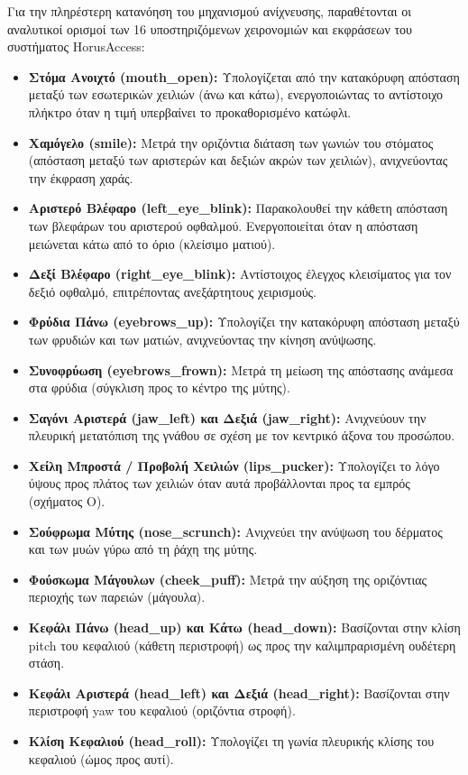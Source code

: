 \documentclass[twoside, a4paper, 11pt]{article}
\newcommand{\textlatin}[1]{\textenglish{#1}}
\begin{document}
Για την πληρέστερη κατανόηση του μηχανισμού ανίχνευσης, παραθέτονται οι αναλυτικοί ορισμοί των 16 υποστηριζόμενων χειρονομιών και εκφράσεων του συστήματος \textlatin{HorusAccess}:

\begin{itemize}
    \item \textbf{Στόμα Ανοιχτό (\textlatin{mouth\_open}):} Υπολογίζεται από την κατακόρυφη απόσταση μεταξύ των εσωτερικών χειλιών (άνω και κάτω), ενεργοποιώντας το αντίστοιχο πλήκτρο όταν η τιμή υπερβαίνει το προκαθορισμένο κατώφλι.
    \item \textbf{Χαμόγελο (\textlatin{smile}):} Μετρά την οριζόντια διάταση των γωνιών του στόματος (απόσταση μεταξύ των αριστερών και δεξιών ακρών των χειλιών), ανιχνεύοντας την έκφραση χαράς.
    \item \textbf{Αριστερό Βλέφαρο (\textlatin{left\_eye\_blink}):} Παρακολουθεί την κάθετη απόσταση των βλεφάρων του αριστερού οφθαλμού. Ενεργοποιείται όταν η απόσταση μειώνεται κάτω από το όριο (κλείσιμο ματιού).
    \item \textbf{Δεξί Βλέφαρο (\textlatin{right\_eye\_blink}):} Αντίστοιχος έλεγχος κλεισίματος για τον δεξιό οφθαλμό, επιτρέποντας ανεξάρτητους χειρισμούς.
    \item \textbf{Φρύδια Πάνω (\textlatin{eyebrows\_up}):} Υπολογίζει την κατακόρυφη απόσταση μεταξύ των φρυδιών και των ματιών, ανιχνεύοντας την κίνηση ανύψωσης.
    \item \textbf{Συνοφρύωση (\textlatin{eyebrows\_frown}):} Μετρά τη μείωση της απόστασης ανάμεσα στα φρύδια (σύγκλιση προς το κέντρο της μύτης).
    \item \textbf{Σαγόνι Αριστερά (\textlatin{jaw\_left}) και Δεξιά (\textlatin{jaw\_right}):} Ανιχνεύουν την πλευρική μετατόπιση της γνάθου σε σχέση με τον κεντρικό άξονα του προσώπου.
    \item \textbf{Χείλη Μπροστά / Προβολή Χειλιών (\textlatin{lips\_pucker}):} Υπολογίζει το λόγο ύψους προς πλάτος των χειλιών όταν αυτά προβάλλονται προς τα εμπρός (σχήματος \textlatin{O}).
    \item \textbf{Σούφρωμα Μύτης (\textlatin{nose\_scrunch}):} Ανιχνεύει την ανύψωση του δέρματος και των μυών γύρω από τη ῥάχη της μύτης.
    \item \textbf{Φούσκωμα Μάγουλων (\textlatin{cheek\_puff}):} Μετρά την αύξηση της οριζόντιας περιοχής των παρειών (μάγουλα).
    \item \textbf{Κεφάλι Πάνω (\textlatin{head\_up}) και Κάτω (\textlatin{head\_down}):} Βασίζονται στην κλίση \textlatin{pitch} του κεφαλιού (κάθετη περιστροφή) ως προς την καλιμπραρισμένη ουδέτερη στάση.
    \item \textbf{Κεφάλι Αριστερά (\textlatin{head\_left}) και Δεξιά (\textlatin{head\_right}):} Βασίζονται στην περιστροφή \textlatin{yaw} του κεφαλιού (οριζόντια στροφή).
    \item \textbf{Κλίση Κεφαλιού (\textlatin{head\_roll}):} Υπολογίζει τη γωνία πλευρικής κλίσης του κεφαλιού (ώμος προς αυτί).
\end{itemize}
\end{document}

